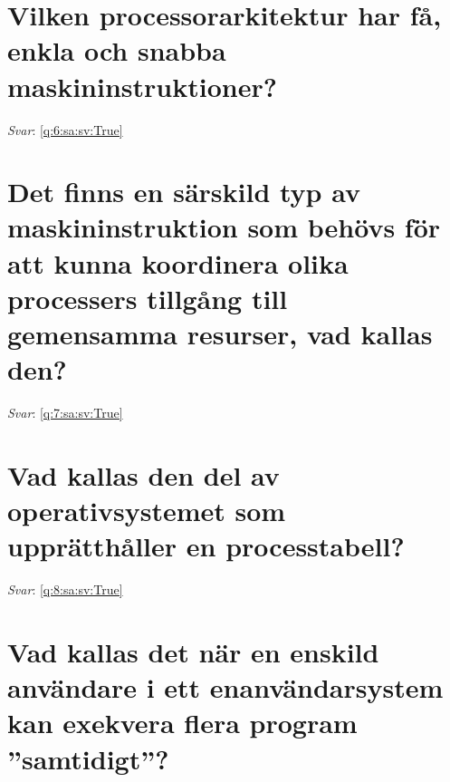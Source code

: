\documentclass[a4paper,11pt,oneside]{book}
\begin{document}
\begin{sloppypar}
\section{Vilken processorarkitektur har f\r{a}, enkla och snabba maskininstruktioner?}

\label{q:6:sa:sv:False}

\vspace{2cm}

\noindent\makebox[\textwidth]{\hrulefill}

\vspace{1cm}

\textit{Svar}: \autoref{q:6:sa:sv:True}



\section{Det finns en s\"arskild typ av maskininstruktion som beh\"ovs f\"or att kunna koordinera olika processers tillg\r{a}ng till gemensamma resurser, vad kallas den?}

\label{q:7:sa:sv:False}

\vspace{2cm}

\noindent\makebox[\textwidth]{\hrulefill}

\vspace{1cm}

\textit{Svar}: \autoref{q:7:sa:sv:True}



\section{Vad kallas den del av operativsystemet som uppr\"atth\r{a}ller en processtabell?}

\label{q:8:sa:sv:False}

\vspace{2cm}

\noindent\makebox[\textwidth]{\hrulefill}

\vspace{1cm}

\textit{Svar}: \autoref{q:8:sa:sv:True}



\section{Vad kallas det n\"ar en enskild anv\"andare i ett enanv\"andarsystem kan exekvera flera program {\textquotedblright}samtidigt{\textquotedblright}?}


\end{sloppypar}
\end{document}

